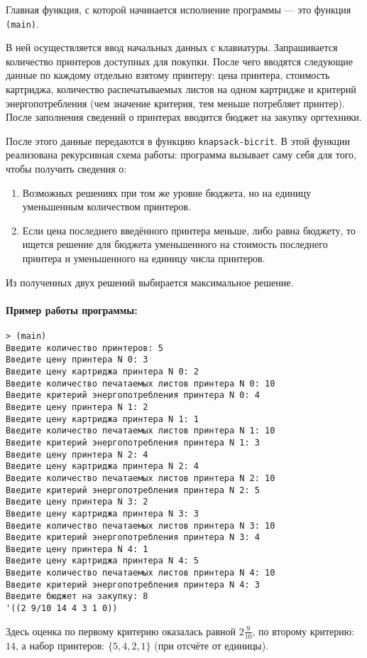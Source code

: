 
Главная функция, с которой начинается исполнение программы --- это функция \verb|(main)|.

В ней осуществляется ввод начальных данных с клавиатуры. Запрашивается количество принтеров доступных для покупки. После чего вводятся следующие данные по каждому отдельно взятому принтеру: цена принтера, стоимость картриджа, количество распечатываемых листов на одном картридже и критерий энергопотребления (чем значение критерия, тем меньше потребляет принтер). После заполнения сведений о принтерах вводится бюджет на закупку оргтехники.

После этого данные передаются в функцию \verb|knapsack-bicrit|. В этой функции реализована рекурсивная схема работы: программа вызывает саму себя для того, чтобы получить сведения о:

\begin{enumerate}
\item{Возможных решениях при том же уровне бюджета, но на единицу уменьшенным количеством принтеров.}
\item{Если цена последнего введённого принтера меньше, либо равна бюджету, то ищется решение для бюджета уменьшенного на стоимость последнего принтера и уменьшенного на единицу числа принтеров.}
\end{enumerate}

Из полученных двух решений выбирается максимальное решение.

\paragraph*{Пример работы программы:}

\begin{verbatim}
> (main)
Введите количество принтеров: 5
Введите цену принтера N 0: 3
Введите цену картриджа принтера N 0: 2
Введите количество печатаемых листов принтера N 0: 10
Введите критерий энергопотребления принтера N 0: 4
Введите цену принтера N 1: 2
Введите цену картриджа принтера N 1: 1
Введите количество печатаемых листов принтера N 1: 10
Введите критерий энергопотребления принтера N 1: 3
Введите цену принтера N 2: 4
Введите цену картриджа принтера N 2: 4
Введите количество печатаемых листов принтера N 2: 10
Введите критерий энергопотребления принтера N 2: 5
Введите цену принтера N 3: 2
Введите цену картриджа принтера N 3: 3
Введите количество печатаемых листов принтера N 3: 10
Введите критерий энергопотребления принтера N 3: 4
Введите цену принтера N 4: 1
Введите цену картриджа принтера N 4: 5
Введите количество печатаемых листов принтера N 4: 10
Введите критерий энергопотребления принтера N 4: 3
Введите бюджет на закупку: 8
'((2 9/10 14 4 3 1 0))
\end{verbatim}

Здесь оценка по первому критерию оказалась равной $2 \frac{9}{10}$, по второму критерию: $14$, а набор принтеров: $\{5, 4, 2, 1\}$ (при отсчёте от единицы).
